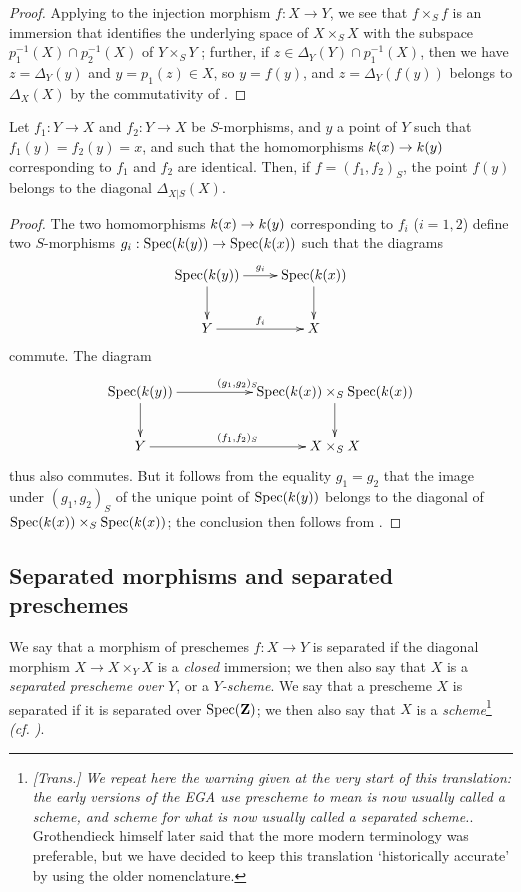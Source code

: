 \begin{proof}
\label{proof-1.5.3.16}
Applying  to the injection morphism $f:X\to Y$, we see that $f\times_S f$ is an immersion that identifies the underlying space of $X\times_S X$ with the subspace $p_1^{-1}(X)\cap p_2^{-1}(X)$ of $Y\times_S Y$ ;
further, if $z\in\Delta_Y(Y)\cap p_1^{-1}(X)$, then we have $z=\Delta_Y(y)$
and $y=p_1(z)\in X$, so $y=f(y)$, and $z=\Delta_Y(f(y))$ belongs to $\Delta_X(X)$ by the commutativity of .
\end{proof}

\begin{cor}[5.3.17]
\label{1.5.3.17}
Let $f_1:Y\to X$ and $f_2:Y\to X$ be $S$-morphisms, and $y$ a point of $Y$ such that $f_1(y)=f_2(y)=x$, and such that the homomorphisms $\kres(x)\to\kres(y)$ corresponding to $f_1 $ and $f_2$ are identical.
Then, if $f=(f_1,f_2)_S$, the point $f(y)$ belongs to the diagonal $\Delta_{X|S}(X)$.
\end{cor}

\begin{proof}
\label{proof-1.5.3.17}
The two homomorphisms $\kres(x)\to\kres(y)$ corresponding to $f_i$ ($i=1,2$) define two $S$-morphisms $g_i:\Spec(\kres(y))\to\Spec(\kres(x))$ such that the diagrams
\[
  \xymatrix{
    \Spec(\kres(y))\ar[r]^{g_i}\ar[d] &
    \Spec(\kres(x))\ar[d]\\
    Y\ar[r]^{f_i} &
    X
  }
\]
commute.
The diagram
\[
  \xymatrix{
    \Spec(\kres(y))\ar[rr]^{(g_1,g_2)_S}\ar[d] & &
    \Spec(\kres(x))\times_S\Spec(\kres(x))\ar[d]\\
    Y\ar[rr]^{(f_1,f_2)_S} & &
    X\times_S X
  }
\]
thus also commutes.
But it follows from the equality $g_1=g_2$ that the image under $(g_1,g_2)_S$ of the unique point of ${\mathop{\mathrm{Spec}}\nolimits}(k(y))$ belongs to the diagonal of ${\mathop{\mathrm{Spec}}\nolimits}(k(x))\times_S{\mathop{\mathrm{Spec}}\nolimits}(k(x))$;
the conclusion then follows from .
\end{proof}

\subsection{Separated morphisms and separated preschemes}
\label{subsection:separated-morphism-and-separated-preschemes}

\begin{defn}[5.4.1]
\label{1.5.4.1}
We say that a morphism of preschemes $f:X\to Y$ is separated if the diagonal morphism $X\to X\times_Y X$ is a \emph{closed} immersion;
we then also say that $X$ is a \emph{separated prescheme over $Y$}, or a \emph{$Y$-scheme}.
We say that a prescheme $X$ is separated if it is separated over ${\mathop{\mathrm{Spec}}\nolimits}(\mathbf{Z})$;
we then also say that $X$ is a \emph{scheme}\footnote{\emph{[Trans.] We repeat here the warning given at the very start of this translation: the early versions of the EGA use \emph{prescheme} to mean is now usually called a scheme, and \emph{scheme} for what is now usually called a separated scheme.}. Grothendieck himself later said that the more modern terminology was preferable, but we have decided to keep this translation `historically accurate' by using the older nomenclature.} \emph{(cf. )}.
\end{defn}

